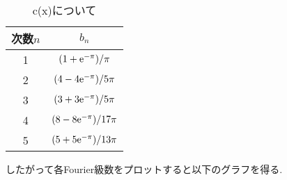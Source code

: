 \begin{table}[htbp]
  \caption{c(x)について}
  \label{tbl:c}
  \centering
  \begin{tabular}{c|c}
    \hline
    次数$n$ & $b_n$                       \\
    \hline \hline
    1       & $(1+{\rm e}^{-\pi})/\pi$    \\
    2       & $(4-4{\rm e}^{-\pi})/5\pi$  \\
    3       & $(3+3{\rm e}^{-\pi})/5\pi$  \\
    4       & $(8-8{\rm e}^{-\pi})/17\pi$ \\
    5       & $(5+5{\rm e}^{-\pi})/13\pi$ \\
    \hline
  \end{tabular}
\end{table}
\clearpage
したがって各Fourier級数をプロットすると以下のグラフを得る.
